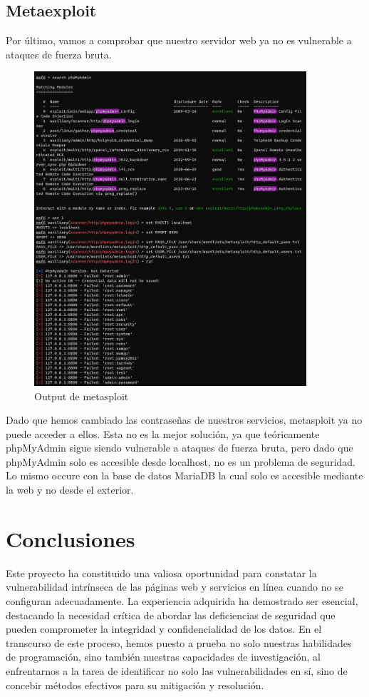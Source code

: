 \documentclass{report}
\begin{document}
        \section{Metaexploit}
            Por último, vamos a comprobar que nuestro servidor web ya no es vulnerable a ataques de fuerza bruta.
            \begin{figure}[H]
                \centering
                \includegraphics[width=0.9\textwidth]{./img/audit2/msf1.png}
                \caption{Output de metasploit}
            \end{figure}
            Dado que hemos cambiado las contraseñas de nuestros servicios, metasploit ya no puede acceder a ellos.
            Esta no es la mejor solución, ya que teóricamente phpMyAdmin sigue siendo vulnerable a ataques de fuerza bruta, pero dado que phpMyAdmin solo es accesible desde localhost, no es un problema de seguridad.
            Lo mismo occure con la base de datos MariaDB la cual solo es accesible mediante la web y no desde el exterior.
        \clearpage
    \chapter{Conclusiones}
        Este proyecto ha constituido una valiosa oportunidad para constatar la vulnerabilidad intrínseca de las páginas web y servicios en línea cuando no se configuran adecuadamente. La experiencia adquirida ha demostrado ser esencial, destacando la necesidad crítica de abordar las deficiencias de seguridad que pueden comprometer la integridad y confidencialidad de los datos. En el transcurso de este proceso, hemos puesto a prueba no solo nuestras habilidades de programación, sino también nuestras capacidades de investigación, al enfrentarnos a la tarea de identificar no solo las vulnerabilidades en sí, sino de concebir métodos efectivos para su mitigación y resolución.\\
        
\end{document}
